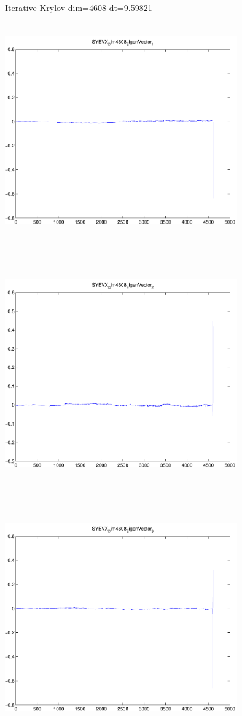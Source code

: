 \documentclass[9pt]{article}
\theoremstyle{plain}
\theoremstyle{definition}
\theoremstyle{remark}
\numberwithin{equation}{section}
\begin{document}
Iterative Krylov dim=4608 dt=9.59821
\includegraphics[width=10.0cm,height=10.0cm]{SYEVX_Dim4608_EigenVector_1.pdf}

\includegraphics[width=10.0cm,height=10.0cm]{SYEVX_Dim4608_EigenVector_2.pdf}

\includegraphics[width=10.0cm,height=10.0cm]{SYEVX_Dim4608_EigenVector_3.pdf}
\end{document}
